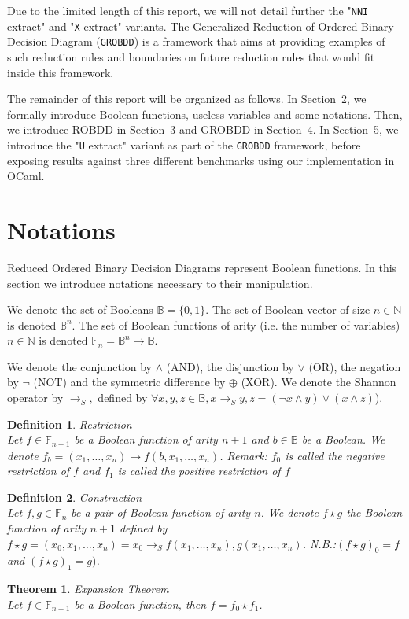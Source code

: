\documentclass[a4paper,10pt]{article}
\newcommand{\shannon}[3]{#1 \longrightarrow_S #2, #3}
\newcommand{\N}{\mathbb{N}}%
\newcommand{\B}{\mathbb{B}}
\newcommand{\F}{\mathbb{F}}
\newcommand{\uextract}{"\texttt{U} extract"}
\newcommand{\nniextract}{"\texttt{NNI} extract"}
\newcommand{\xextract}{"\texttt{X} extract"}
\newcommand{\GroBdd}{\texttt{GROBDD}}
\newtheorem{newtheo}{Theorem}
\newcommand{\theorem}[2]{\begin{newtheo}{\textsf{#1}\\} #2 \end{newtheo}}
\newtheorem{newdef}{Definition}
\newcommand{\definition}[2]{\begin{newdef}{#1\\}#2\end{newdef}}
\begin{document}
Due to the limited length of this report, we will not detail further the \nniextract{} and \xextract{} variants.
The Generalized Reduction of Ordered Binary Decision Diagram (\GroBdd{}) is a framework that aims at providing examples of such reduction rules and boundaries on future reduction rules that would fit inside this framework.

The remainder of this report will be organized as follows.
In Section~2, we formally introduce Boolean functions, useless variables and some notations.
Then, we introduce ROBDD in Section~3 and GROBDD in Section~4.
In Section~5, we introduce the \uextract{} variant as part of the \GroBdd{} framework, before exposing results against three  different benchmarks \cite{BenchSatlib, BenchLgsynth91, BenchIscas99} using our implementation in OCaml.

\section{Notations}

Reduced Ordered Binary Decision Diagrams represent Boolean functions.
In this section we introduce notations necessary to their manipulation.


We denote the set of Booleans $\B = \{0, 1\}$.
The set of Boolean vector of size $n\in\N$ is denoted $\B^n$.
The set of Boolean functions of arity (i.e. the number of variables) $n\in\N$ is denoted $\F_n = \B^n \longrightarrow \B$.


We denote the conjunction by $\land$ (AND), the disjunction by $\lor$ (OR), the negation by $\lnot$ (NOT) and the symmetric difference by $\oplus$ (XOR).
We denote the Shannon operator by $\shannon{}{}{}$ defined by $\forall x, y, z\in\B, \shannon{x}{y}{z} = (\lnot x \land y) \lor (x \land z)$).

\definition{Restriction}
{
	Let $f\in\F_{n+1}$ be a Boolean function of arity $n+1$ and $b\in\B$ be a Boolean.
	We denote $f_b = (x_1, \dots, x_n) \longrightarrow f(b, x_1, \dots, x_n)$.
	Remark: $f_0$ is called the negative restriction of $f$ and $f_1$ is called the positive restriction of $f$
}

\definition{Construction}
{
	Let $f, g\in\F_n$ be a pair of Boolean function of arity $n$.
	We denote $f\star{}g$ the Boolean function of arity $n+1$ defined by $ f\star{}g = (x_0, x_1, \dots, x_n) = \shannon{x_0}{f(x_1, \dots, x_n)}{g(x_1, \dots, x_n)}$.
	N.B.:$(f\star g)_0 = f$ and $ (f\star g)_1 = g)$.
}

\theorem{Expansion Theorem}{
Let $f\in\F_{n+1}$ be a Boolean function, then $f = f_0 \star f_1$.
}
\end{document}
